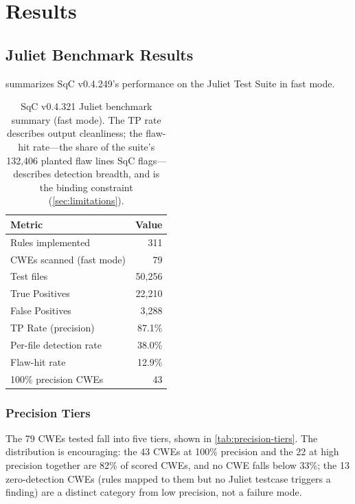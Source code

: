 \section{Results}
\label{sec:results}

\subsection{Juliet Benchmark Results}

 summarizes SqC v0.4.249's performance on
the Juliet Test Suite in fast mode.

\begin{table}[t]
\centering
\footnotesize
\begin{tabular}{@{}lr@{}}
\toprule
\textbf{Metric} & \textbf{Value} \\
\midrule
Rules implemented & 311 \\
CWEs scanned (fast mode) & 79 \\
Test files & 50,256 \\
True Positives & 22,210 \\
False Positives & 3,288 \\
TP Rate (precision) & 87.1\% \\
Per-file detection rate & 38.0\% \\
Flaw-hit rate & 12.9\% \\
100\% precision CWEs & 43 \\
\bottomrule
\end{tabular}
\caption{SqC v0.4.321 Juliet benchmark summary (fast mode).  The TP
rate describes output cleanliness; the flaw-hit rate---the share of
the suite's 132,406 planted flaw lines SqC flags---describes detection
breadth, and is the binding constraint (\cref{sec:limitations}).}
\label{tab:juliet-summary}
\end{table}

\subsubsection{Precision Tiers}

The 79 CWEs tested fall into five tiers, shown in
\cref{tab:precision-tiers}.  The distribution is encouraging: the
43 CWEs at 100\% precision and the 22 at high precision together are
82\% of scored CWEs, and no CWE falls below 33\%; the 13 zero-detection
CWEs (rules mapped to them but no Juliet testcase triggers a finding)
are a distinct category from low precision, not a failure mode.

